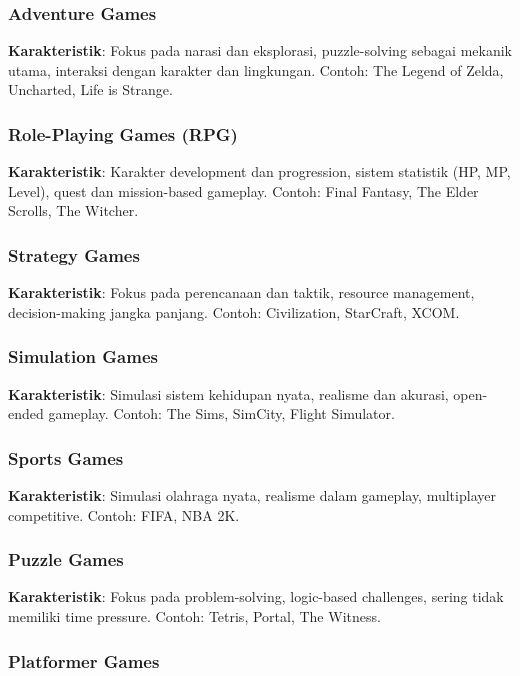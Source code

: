 \subsubsection{Adventure Games}

\textbf{Karakteristik}: Fokus pada narasi dan eksplorasi, puzzle-solving sebagai mekanik utama, interaksi dengan karakter dan lingkungan. Contoh: The Legend of Zelda, Uncharted, Life is Strange.

\subsubsection{Role-Playing Games (RPG)}

\textbf{Karakteristik}: Karakter development dan progression, sistem statistik (HP, MP, Level), quest dan mission-based gameplay. Contoh: Final Fantasy, The Elder Scrolls, The Witcher.

\subsubsection{Strategy Games}

\textbf{Karakteristik}: Fokus pada perencanaan dan taktik, resource management, decision-making jangka panjang. Contoh: Civilization, StarCraft, XCOM.

\subsubsection{Simulation Games}

\textbf{Karakteristik}: Simulasi sistem kehidupan nyata, realisme dan akurasi, open-ended gameplay. Contoh: The Sims, SimCity, Flight Simulator.

\subsubsection{Sports Games}

\textbf{Karakteristik}: Simulasi olahraga nyata, realisme dalam gameplay, multiplayer competitive. Contoh: FIFA, NBA 2K.

\subsubsection{Puzzle Games}

\textbf{Karakteristik}: Fokus pada problem-solving, logic-based challenges, sering tidak memiliki time pressure. Contoh: Tetris, Portal, The Witness.

\subsubsection{Platformer Games}

